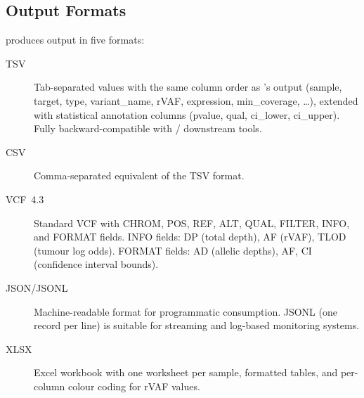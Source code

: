 \subsection{Output Formats}
\label{sec:output}

\kmerdet{} produces output in five formats:

\begin{description}
  \item[TSV] Tab-separated values with the same column order as \km{}'s output
    (sample, target, type, variant\_name, rVAF, expression, min\_coverage, \ldots),
    extended with statistical annotation columns (pvalue, qual, ci\_lower,
    ci\_upper).  Fully backward-compatible with \km{}/\kmtools{} downstream tools.
  \item[CSV] Comma-separated equivalent of the TSV format.
  \item[VCF~4.3] Standard VCF with CHROM, POS, REF, ALT, QUAL, FILTER, INFO,
    and FORMAT fields.  INFO fields: DP (total depth), AF (rVAF), TLOD (tumour log
    odds).  FORMAT fields: AD (allelic depths), AF, CI (confidence interval bounds).
  \item[JSON/JSONL] Machine-readable format for programmatic consumption.
    JSONL (one record per line) is suitable for streaming and log-based
    monitoring systems.
  \item[XLSX] Excel workbook with one worksheet per sample, formatted tables, and
    per-column colour coding for rVAF values.
\end{description}
